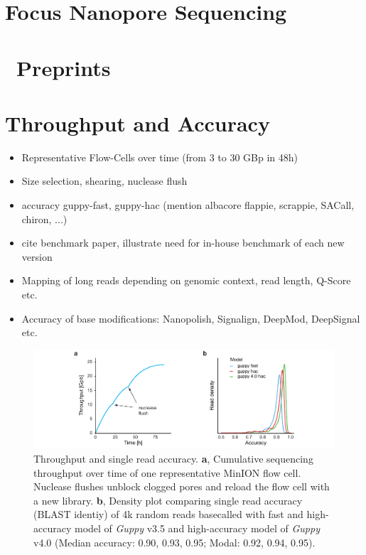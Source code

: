 \section{Focus Nanopore Sequencing}
\label{sec:state_of_art:nanopore}




\section{\Biorxiv\ Preprints}
\label{sec:state_of_art:biorxiv}




\section{Throughput and Accuracy}
\label{sec:stat_of_art:throughput}

\begin{itemize}
    \item Representative Flow-Cells over time (from 3 to 30 GBp in 48h)
    \item Size selection, shearing, nuclease flush
    \item accuracy guppy-fast, guppy-hac (mention albacore flappie, scrappie, SACall, chiron, ...)
    \item cite benchmark paper, illustrate need for in-house benchmark of each new version
    \item Mapping of long reads depending on genomic context, read length, Q-Score etc.
    \item Accuracy of base modifications: Nanopolish, Signalign, DeepMod, DeepSignal etc.
\end{itemize}

\begin{figure}[h]
    \centering
    \includegraphics[width=1.0\textwidth]{figures/state_of_art/throughput.pdf}
    \captionsetup{format=plain}
    \caption[Throughput and accuracy]{Throughput and single read accuracy. \textbf{a}, Cumulative sequencing throughput over time of one representative MinION flow cell. Nuclease flushes unblock clogged pores and reload the flow cell with a new library. \textbf{b}, Density plot comparing single read accuracy (BLAST identiy) of 4k random reads basecalled with fast and high-accuracy model of \textit{Guppy} v3.5 and high-accuracy model of \textit{Guppy} v4.0 (Median accuracy: 0.90, 0.93, 0.95; Modal: 0.92, 0.94, 0.95).}
    \label{fig:state_of_art:throughput}
\end{figure}

